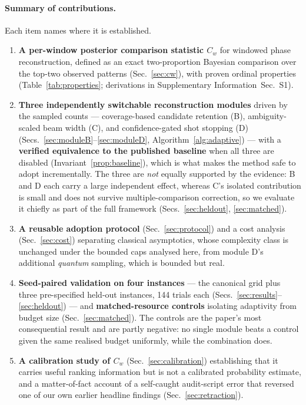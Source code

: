 \documentclass[preprint,11pt]{elsarticle}
\newcommand{\SI}{Supplementary Information}
\newcommand{\SIproofs}{\SI{}~Sec.~S1}
\newcommand{\Cw}{C_w}
\begin{document}
\paragraph{Summary of contributions.} Each item names where it is
established.

\begin{enumerate}\itemsep2pt
\item \textbf{A per-window posterior comparison statistic $\Cw$} for
windowed phase reconstruction, defined as an exact two-proportion
Bayesian comparison over the top-two observed patterns
(Sec.~\ref{sec:cw}), with proven ordinal properties
(Table~\ref{tab:properties}; derivations in \SIproofs{}).

\item \textbf{Three independently switchable reconstruction modules}
driven by the sampled counts --- coverage-based candidate retention (B),
ambiguity-scaled beam width (C), and confidence-gated shot stopping (D)
(Secs.~\ref{sec:moduleB}--\ref{sec:moduleD},
Algorithm~\ref{alg:adaptive}) --- with a \textbf{verified equivalence to
the published baseline} when all three are disabled
(Invariant~\ref{prop:baseline}), which is what makes the method safe to
adopt incrementally. The three are \emph{not} equally supported by the
evidence: B and D each carry a large independent effect, whereas C's
isolated contribution is small and does not survive multiple-comparison
correction, so we evaluate it chiefly as part of the full framework
(Secs.~\ref{sec:heldout}, \ref{sec:matched}).

\item \textbf{A reusable adoption protocol} (Sec.~\ref{sec:protocol}) and
a cost analysis (Sec.~\ref{sec:cost}) separating classical asymptotics,
whose complexity class is unchanged under the bounded caps analysed here,
from module D's additional \emph{quantum} sampling, which is bounded but
real.

\item \textbf{Seed-paired validation on four instances} --- the canonical
grid plus three pre-specified held-out instances, 144 trials each
(Secs.~\ref{sec:results}--\ref{sec:heldout}) --- and
\textbf{matched-resource controls} isolating adaptivity from budget size
(Sec.~\ref{sec:matched}). The controls are the paper's most consequential
result and are partly negative: no single module beats a control given
the same realised budget uniformly, while the combination does.

\item \textbf{A calibration study of $\Cw$} (Sec.~\ref{sec:calibration})
establishing that it carries useful ranking information but is not a
calibrated probability estimate, and
a matter-of-fact account of a self-caught audit-script error that
reversed one of our own earlier headline findings
(Sec.~\ref{sec:retraction}).
\end{enumerate}
\end{document}
